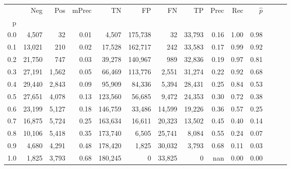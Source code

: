 \begin{tabular}{rrrrrrrrrrrrrr}
\toprule
{} &     Neg &    Pos & mPrec &       TN &       FP &      FN &      TP &  Prec &   Rec & $\hat{p}$ \\
p   &         &        &       &          &          &         &         &       &       &           \\
\midrule
0.0 &   4,507 &     32 &  0.01 &    4,507 &  175,738 &      32 &  33,793 &  0.16 &  1.00 &      0.98 \\
0.1 &  13,021 &    210 &  0.02 &   17,528 &  162,717 &     242 &  33,583 &  0.17 &  0.99 &      0.92 \\
0.2 &  21,750 &    747 &  0.03 &   39,278 &  140,967 &     989 &  32,836 &  0.19 &  0.97 &      0.81 \\
0.3 &  27,191 &  1,562 &  0.05 &   66,469 &  113,776 &   2,551 &  31,274 &  0.22 &  0.92 &      0.68 \\
0.4 &  29,440 &  2,843 &  0.09 &   95,909 &   84,336 &   5,394 &  28,431 &  0.25 &  0.84 &      0.53 \\
0.5 &  27,651 &  4,078 &  0.13 &  123,560 &   56,685 &   9,472 &  24,353 &  0.30 &  0.72 &      0.38 \\
0.6 &  23,199 &  5,127 &  0.18 &  146,759 &   33,486 &  14,599 &  19,226 &  0.36 &  0.57 &      0.25 \\
0.7 &  16,875 &  5,724 &  0.25 &  163,634 &   16,611 &  20,323 &  13,502 &  0.45 &  0.40 &      0.14 \\
0.8 &  10,106 &  5,418 &  0.35 &  173,740 &    6,505 &  25,741 &   8,084 &  0.55 &  0.24 &      0.07 \\
0.9 &   4,680 &  4,291 &  0.48 &  178,420 &    1,825 &  30,032 &   3,793 &  0.68 &  0.11 &      0.03 \\
1.0 &   1,825 &  3,793 &  0.68 &  180,245 &        0 &  33,825 &       0 &   nan &  0.00 &      0.00 \\
\bottomrule
\end{tabular}
